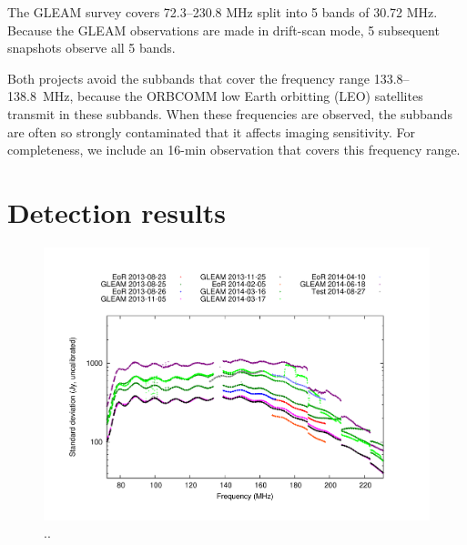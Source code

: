 \documentclass[useAMS,usenatbib]{mn2e}
\begin{document}
The GLEAM survey covers 72.3--230.8 MHz split into 5 bands of 30.72 MHz. Because the GLEAM observations are made in drift-scan mode, 5 subsequent snapshots observe all 5 bands.

Both projects avoid the subbands that cover the frequency range 133.8--138.8~MHz, because the ORBCOMM low Earth orbitting (LEO) satellites transmit in these subbands. When these frequencies are observed, the subbands are often so strongly contaminated that it affects imaging sensitivity. For completeness, we include an 16-min observation that covers this frequency range.

\section{Detection results}

\noindent\begin{figure}
\begin{center}\hspace*{-0.2cm}\includegraphics[width=18cm]{img/plot-stddev-per-set}\vspace{-1cm}
\caption{..}
\label{fig:stddev-per-set}
\end{center}
\end{figure}
\end{document}
